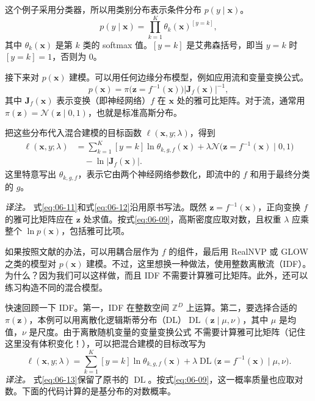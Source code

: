 这个例子采用分类器，所以用类别分布表示条件分布 $p(y\mid\mathbf{x})$。
\begin{equation}
p(y\mid\mathbf{x})=\prod_{k=1}^K\theta_k(\mathbf{x})^{[y=k]},
\tag{6.10}\label{eq:06-10}
\end{equation}
其中 $\theta_k(\mathbf{x})$ 是第 $k$ 类的 softmax 值。$[y=k]$ 是艾弗森括号，即当 $y=k$ 时 $[y=k]=1$，否则为 0。

接下来对 $p(\mathbf{x})$ 建模。可以用任何边缘分布模型，例如应用流和变量变换公式。
\begin{equation}
p(\mathbf{x})=\pi\bigl(\mathbf{z}=f^{-1}(\mathbf{x})\bigr)\left|\mathbf{J}_f(\mathbf{x})\right|^{-1},
\tag{6.11}\label{eq:06-11}
\end{equation}
其中 $\mathbf{J}_f(\mathbf{x})$ 表示变换（即神经网络）$f$ 在 $\mathbf{x}$ 处的雅可比矩阵。对于流，通常用 $\pi(\mathbf{z})=\mathcal{N}(\mathbf{z}\mid0,1)$，也就是标准高斯分布。

把这些分布代入混合建模的目标函数 $\ell(\mathbf{x},y;\lambda)$，得到
\begin{equation}
\begin{aligned}
\ell(\mathbf{x},y;\lambda)
&=\sum_{k=1}^K[y=k]\ln\theta_{k,g,f}(\mathbf{x})
+\lambda\mathcal{N}\bigl(\mathbf{z}=f^{-1}(\mathbf{x})\mid0,1\bigr)\\
&\quad-\ln\left|\mathbf{J}_f(\mathbf{x})\right|.
\end{aligned}
\tag{6.12}\label{eq:06-12}
\end{equation}
这里特意写出 $\theta_{k,g,f}$，表示它由两个神经网络参数化，即流中的 $f$ 和用于最终分类的 $g$。

\emph{译注。} 式\eqref{eq:06-11}和式\eqref{eq:06-12}沿用原书写法。既然 $\mathbf{z}=f^{-1}(\mathbf{x})$，正向变换 $f$ 的雅可比矩阵应在 $\mathbf{z}$ 处求值。按式\eqref{eq:06-09}，高斯密度应取对数，且权重 $\lambda$ 应乘整个 $\ln p(\mathbf{x})$，包括雅可比项。

如果按照文献的办法，可以用耦合层作为 $f$ 的组件，最后用 RealNVP 或 GLOW 之类的模型对 $p(\mathbf{x})$ 建模。不过，这里想换一种做法，使用整数离散流（IDF）。为什么？因为我们可以这样做，而且 IDF 不需要计算雅可比矩阵。此外，还可以练习构造不同的混合模型。

快速回顾一下 IDF。第一，IDF 在整数空间 $\mathbb{Z}^D$ 上运算。第二，要选择合适的 $\pi(\mathbf{z})$，本例可以用离散化逻辑斯蒂分布（DL）$\operatorname{DL}(\mathbf{z}\mid\mu,\nu)$，其中 $\mu$ 是均值，$\nu$ 是尺度。由于离散随机变量的变量变换公式
不需要计算雅可比矩阵（记住这里没有体积变化！），可以把混合建模的目标改写为
\begin{equation}
\ell(\mathbf{x},y;\lambda)=\sum_{k=1}^K[y=k]\ln\theta_{k,g,f}(\mathbf{x})
+\lambda\operatorname{DL}\bigl(\mathbf{z}=f^{-1}(\mathbf{x})\mid\mu,\nu\bigr).
\tag{6.13}\label{eq:06-13}
\end{equation}
\emph{译注。} 式\eqref{eq:06-13}保留了原书的 $\operatorname{DL}$。按式\eqref{eq:06-09}，这一概率质量也应取对数。下面的代码计算的是基分布的对数概率。

